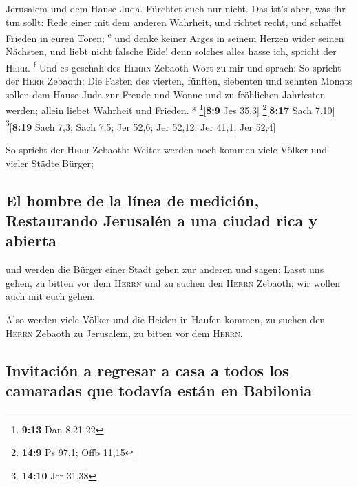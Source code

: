 Jerusalem und dem Hause Juda. Fürchtet euch nur nicht. 
Das ist's aber, was ihr tun sollt: Rede einer mit dem anderen Wahrheit,
und richtet recht, und schaffet Frieden in euren Toren;
\textsuperscript{e}  und denke keiner Arges in seinem
Herzen wider seinen Nächsten, und liebt nicht falsche Eide! denn solches
alles hasse ich, spricht der \textsc{Herr}. \textsuperscript{f}
 Und es geschah des \textsc{Herrn} Zebaoth Wort zu mir
und sprach:  So spricht der \textsc{Herr} Zebaoth: Die
Fasten des vierten, fünften, siebenten und zehnten Monats sollen dem
Hause Juda zur Freude und Wonne und zu fröhlichen Jahrfesten werden;
allein liebet Wahrheit und Frieden. \textsuperscript{g}
\footnote{\textbf{9:13} Dan 8,21-22}{[}\textbf{8:9} Jes 35,3{]}
\footnote{\textbf{14:9} Ps 97,1; Offb 11,15}{[}\textbf{8:17} Sach
7,10{]} \footnote{\textbf{14:10} Jer 31,38}{[}\textbf{8:19} Sach 7,3;
Sach 7,5; Jer 52,6; Jer 52,12; Jer 41,1; Jer 52,4{]}

 So spricht der \textsc{Herr} Zebaoth: Weiter werden noch
kommen viele Völker und vieler Städte Bürger;

\hypertarget{el-hombre-de-la-luxednea-de-mediciuxf3n-restaurando-jerusaluxe9n-a-una-ciudad-rica-y-abierta}{%
\subsection{El hombre de la línea de medición, Restaurando Jerusalén a
una ciudad rica y
abierta}\label{el-hombre-de-la-luxednea-de-mediciuxf3n-restaurando-jerusaluxe9n-a-una-ciudad-rica-y-abierta}}

 und werden die Bürger einer Stadt gehen zur anderen und
sagen: Lasst uns gehen, zu bitten vor dem \textsc{Herrn} und zu suchen
den \textsc{Herrn} Zebaoth; wir wollen auch mit euch gehen.

 Also werden viele Völker und die Heiden in Haufen
kommen, zu suchen den \textsc{Herrn} Zebaoth zu Jerusalem, zu bitten vor
dem \textsc{Herrn}.

\hypertarget{invitaciuxf3n-a-regresar-a-casa-a-todos-los-camaradas-que-todavuxeda-estuxe1n-en-babilonia}{%
\subsection{Invitación a regresar a casa a todos los camaradas que
todavía están en
Babilonia}\label{invitaciuxf3n-a-regresar-a-casa-a-todos-los-camaradas-que-todavuxeda-estuxe1n-en-babilonia}}

